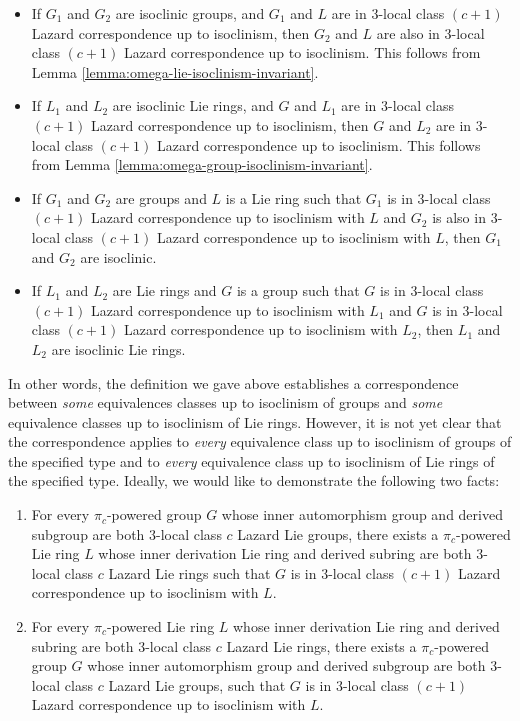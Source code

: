 \begin{itemize}
\item If $G_1$ and $G_2$ are isoclinic groups, and $G_1$ and $L$ are
  in $3$-local class $(c + 1)$ Lazard correspondence up to isoclinism,
  then $G_2$ and $L$ are also in $3$-local class $(c + 1)$ Lazard
  correspondence up to isoclinism. This follows from Lemma
  \ref{lemma:omega-lie-isoclinism-invariant}.
\item If $L_1$ and $L_2$ are isoclinic Lie rings, and $G$ and $L_1$
  are in $3$-local class $(c + 1)$ Lazard correspondence up to
  isoclinism, then $G$ and $L_2$ are in $3$-local class $(c + 1)$
  Lazard correspondence up to isoclinism. This follows from Lemma
  \ref{lemma:omega-group-isoclinism-invariant}.
\item If $G_1$ and $G_2$ are groups and $L$ is a Lie ring such that
  $G_1$ is in $3$-local class $(c + 1)$ Lazard correspondence up to
  isoclinism with $L$ and $G_2$ is also in $3$-local class $(c + 1)$ Lazard
  correspondence up to isoclinism with $L$, then $G_1$ and $G_2$ are
  isoclinic.
\item If $L_1$ and $L_2$ are Lie rings and $G$ is a group such that
  $G$ is in $3$-local class $(c + 1)$ Lazard correspondence up to isoclinism
  with $L_1$ and $G$ is in $3$-local class $(c + 1)$ Lazard correspondence
  up to isoclinism with $L_2$, then $L_1$ and $L_2$ are isoclinic Lie
  rings.
\end{itemize}

In other words, the definition we gave above establishes a
correspondence between {\em some} equivalences classes up to
isoclinism of groups and {\em some} equivalence classes up to
isoclinism of Lie rings. However, it is not yet clear that the
correspondence applies to {\em every} equivalence class up to
isoclinism of groups of the specified type and to {\em every}
equivalence class up to isoclinism of Lie rings of the specified
type. Ideally, we would like to demonstrate the following two facts:

\begin{enumerate}
\item For every $\pi_c$-powered group $G$ whose inner automorphism group
  and derived subgroup are both $3$-local class $c$ Lazard Lie groups,
  there exists a $\pi_c$-powered Lie ring $L$ whose inner derivation Lie
  ring and derived subring are both $3$-local class $c$ Lazard Lie
  rings such that $G$ is in $3$-local class $(c + 1)$ Lazard
  correspondence up to isoclinism with $L$.
\item For every $\pi_c$-powered Lie ring $L$ whose inner derivation Lie
  ring and derived subring are both $3$-local class $c$ Lazard Lie
  rings, there exists a $\pi_c$-powered group $G$ whose inner
  automorphism group and derived subgroup are both $3$-local class $c$
  Lazard Lie groups, such that $G$ is in $3$-local class $(c + 1)$
  Lazard correspondence up to isoclinism with $L$.
\end{enumerate}

